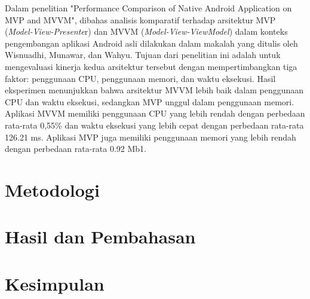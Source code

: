 \documentclass[conference]{IEEEtran}
\begin{document}
Dalam penelitian "Performance Comparison of Native Android Application on MVP and MVVM"\cite{[Perbandingan3]}, dibahas analisis komparatif terhadap arsitektur MVP (\textit{Model-View-Presente}r) dan MVVM (\textit{Model-View-ViewModel}) dalam konteks pengembangan aplikasi Android asli dilakukan dalam makalah yang ditulis oleh Wisnuadhi, Munawar, dan Wahyu. Tujuan dari penelitian ini adalah untuk mengevaluasi kinerja kedua arsitektur tersebut dengan mempertimbangkan tiga faktor: penggunaan CPU, penggunaan memori, dan waktu eksekusi. Hasil eksperimen menunjukkan bahwa arsitektur MVVM lebih baik dalam penggunaan CPU dan waktu eksekusi, sedangkan MVP unggul dalam penggunaan memori. Aplikasi MVVM memiliki penggunaan CPU yang lebih rendah dengan perbedaan rata-rata 0,55\% dan waktu eksekusi yang lebih cepat dengan perbedaan rata-rata 126.21 ms. Aplikasi MVP juga memiliki penggunaan memori yang lebih rendah dengan perbedaan rata-rata 0.92 Mb1.


\section{Metodologi}


\section{Hasil dan Pembahasan}


\section{Kesimpulan}




\vspace{12pt}
\end{document}
